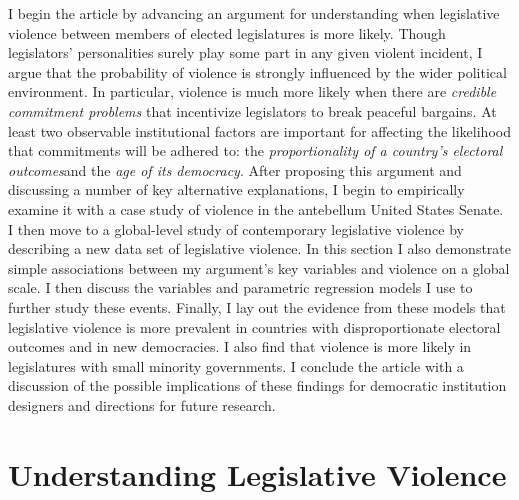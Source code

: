 \documentclass[a4paper]{article}\usepackage[]{graphicx}\usepackage[]{color}
\begin{document}
I begin the article by advancing an argument for understanding when legislative violence between members of  elected legislatures is more likely. Though legislators' personalities surely play some part in any given violent incident, I argue that the probability of violence is strongly influenced by the wider political environment. In particular, violence is much more likely when there are \emph{credible commitment problems} that incentivize legislators to break peaceful bargains. At least two observable institutional factors are important for affecting the likelihood that commitments will be adhered to: the \emph{proportionality of a country's electoral outcomes}and the \emph{age of its democracy}. After proposing this argument and discussing a number of key alternative explanations, I begin to empirically examine it with a case study of violence in the antebellum United States Senate.  I then move to  a global-level study of contemporary legislative violence by describing a new data set of legislative violence. In this section I also demonstrate simple associations between my argument's key variables and violence on a global scale. I then discuss the variables and parametric regression models I use to further study these events. Finally, I lay out the evidence from these models that legislative violence is more prevalent in countries with disproportionate electoral outcomes and in new democracies. I also find that violence is more likely in legislatures with small minority governments. I conclude the article with a discussion of the possible implications of these findings for democratic institution designers and directions for future research.


\section{Understanding Legislative Violence}
\end{document}
